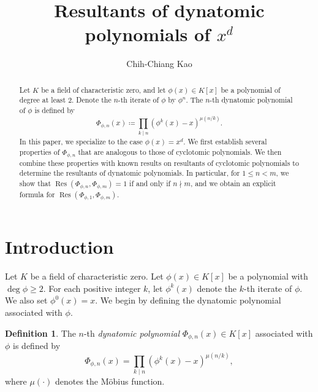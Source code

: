 \documentclass[10pt,leqno]{amsart}
\theoremstyle{definition}
\newtheorem{definition}[theorem]{Definition}
\theoremstyle{remark}
\numberwithin{equation}{section}
\newcommand{\res}{\operatorname{Res}}
\begin{document}
\title{Resultants of dynatomic polynomials of $x^d$} %
\author{Chih-Chiang Kao}
\date{}
\address{Department of Mathematics, Institute of Science Tokyo, 2-12-1 Ookayama, Meguro-ku, 152-8550, Tokyo, Japan}
\maketitle

\let\thefootnote\relax
{} %

\begin{abstract}
Let $K$ be a field of characteristic zero, and let $\phi(x)\in K[x]$ be a polynomial of degree at least 2. Denote the $n$-th iterate of $\phi$ by $\phi^n$. The $n$-th dynatomic polynomial of $\phi$ is defined by $$\Phi_{\phi,n}(x) \coloneqq \prod_{k\mid n}(\phi^k(x)-x)^{\mu(n/k)}.$$
In this paper, we specialize to the case $\phi(x) = x^d$. We first establish several properties of $\Phi_{\phi,n}$ that are analogous to those of cyclotomic polynomials. We then combine these properties with known results on resultants of cyclotomic polynomials to determine the resultants of dynatomic polynomials. In particular, for $1\leq n< m$, we show that $\res(\Phi_{\phi,n},\Phi_{\phi,m}) = 1$
if and only if $n\nmid m$, and we obtain an explicit formula for $\res(\Phi_{\phi,1},\Phi_{\phi,m})$.
\end{abstract} %

\bigskip

\section{Introduction}

Let $K$ be a field of characteristic zero. Let $\phi(x)\in K[x]$ be a polynomial with $\deg\phi\geq 2$. For each positive integer $k$, let $\phi^k(x)$ denote the $k$-th iterate of $\phi$. We also set $\phi^0(x) = x$. We begin by defining the dynatomic polynomial associated with $\phi$.

\begin{definition}
    The $n$-th \textit{dynatomic polynomial} $\Phi_{\phi,n}(x)\in K[x]$ associated with $\phi$ is defined by
    $$\Phi_{\phi,n}(x) = \prod_{k\mid n}(\phi^k(x)-x)^{\mu(n/k)},$$
    where $\mu(\cdot)$ denotes the Möbius function.
\end{definition}
\end{document}
